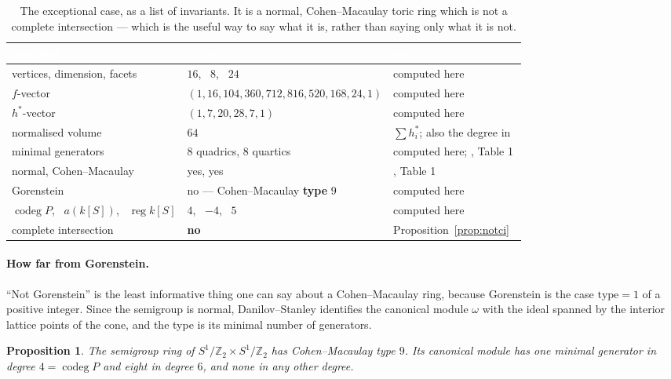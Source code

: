 \documentclass[11pt,a4paper]{article}
\newtheorem{proposition}{Proposition}
\theoremstyle{definition}
\newcommand{\ZZ}{\mathbb{Z}}
\begin{document}
\begin{table}[h]
\centering\small
\begin{tabular}{ll l}
\toprule
\rowcolor{hdrblue}
\textcolor{white}{invariant} & \textcolor{white}{value} & \textcolor{white}{source}\\
\midrule
vertices, dimension, facets & $16$, \ $8$, \ $24$ & computed here\\
\rowcolor{softgrey}
$f$-vector & $(1,16,104,360,712,816,520,168,24,1)$ & computed here\\
$h^*$-vector & $(1,7,20,28,7,1)$ & computed here\\
\rowcolor{softgrey}
normalised volume & $64$ & $\sum h^*_i$; also the degree in~\cite{SScuts}\\
minimal generators & $8$ quadrics, $8$ quartics & computed here; \cite{SScuts}, Table 1\\
\rowcolor{softgrey}
normal, Cohen--Macaulay & yes, yes & \cite{SScuts}, Table 1\\
Gorenstein & no --- Cohen--Macaulay \textbf{type} $9$ & computed here\\
\rowcolor{softgrey}
$\operatorname{codeg}P$, \ $a(k[S])$, \ $\operatorname{reg}k[S]$ & $4$, \ $-4$, \ $5$ &
computed here\\
complete intersection & \textbf{no} & Proposition~\ref{prop:notci}\\
\bottomrule
\end{tabular}
\caption{The exceptional case, as a list of invariants. It is a normal, Cohen--Macaulay toric ring
which is not a complete intersection --- which is the useful way to say what it is, rather than
saying only what it is not.}
\label{tab:invariants}
\end{table}

\paragraph{How far from Gorenstein.} ``Not Gorenstein'' is the least informative thing one can
say about a Cohen--Macaulay ring, because Gorenstein is the case $\mathrm{type}=1$ of a positive
integer. Since the semigroup is normal, Danilov--Stanley identifies the canonical module
$\omega$ with the ideal spanned by the interior lattice points of the cone, and the type is its
minimal number of generators.

\begin{proposition}\label{prop:type}
The semigroup ring of $S^1/\ZZ_2\times S^1/\ZZ_2$ has Cohen--Macaulay type $9$. Its canonical
module has one minimal generator in degree $4=\operatorname{codeg}P$ and eight in degree $6$, and
none in any other degree.
\end{proposition}
\end{document}
